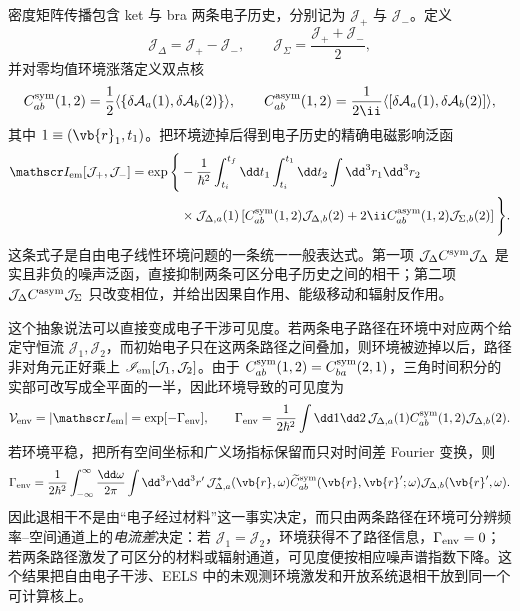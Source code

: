 密度矩阵传播包含 ket 与 bra 两条电子历史，分别记为
$\mathcal J_+$ 与 $\mathcal J_-$。定义
\[
\mathcal J_\Delta=\mathcal J_+-\mathcal J_-,
\qquad
\mathcal J_\Sigma=\frac{\mathcal J_++\mathcal J_-}{2},
\]
并对零均值环境涨落定义双点核
\[
C_{ab}^{\rm sym}(1,2)
=\frac12\langle\{\delta\mathcal A_a(1),\delta\mathcal A_b(2)\}\rangle,
\qquad
C_{ab}^{\rm asym}(1,2)
=\frac1{2\ii}\langle[\delta\mathcal A_a(1),\delta\mathcal A_b(2)]\rangle,
\]
其中 $1\equiv(\vb{r}_1,t_1)$。把环境迹掉后得到电子历史的精确电磁影响泛函
\begin{equation}
{
\begin{aligned}
\mathscr I_{\rm em}[\mathcal J_+,\mathcal J_-]
=\exp\Bigg\{&-\frac1{\hbar^2}
\int_{t_i}^{t_f}\dd t_1
\int_{t_i}^{t_1}\dd t_2
\int\dd^3r_1\dd^3r_2\\
&\times\mathcal J_{\Delta,a}(1)
\left[
C_{ab}^{\rm sym}(1,2)\mathcal J_{\Delta,b}(2)
+2\ii C_{ab}^{\rm asym}(1,2)\mathcal J_{\Sigma,b}(2)
\right]\Bigg\}.
\end{aligned}}
\label{eq:em_gaussian_influence_functional}
\end{equation}
这条式子是自由电子线性环境问题的一条统一一般表达式。第一项
$\mathcal J_\Delta C^{\rm sym}\mathcal J_\Delta$ 是实且非负的噪声泛函，直接抑制两条可区分电子历史之间的相干；第二项
$\mathcal J_\Delta C^{\rm asym}\mathcal J_\Sigma$ 只改变相位，并给出因果自作用、能级移动和辐射反作用。

这个抽象说法可以直接变成电子干涉可见度。若两条电子路径在环境中对应两个给定守恒流 $\mathcal J_1,\mathcal J_2$，而初始电子只在这两条路径之间叠加，则环境被迹掉以后，路径非对角元正好乘上 $\mathscr I_{\rm em}[\mathcal J_1,\mathcal J_2]$。由于 $C_{ab}^{\rm sym}(1,2)=C_{ba}^{\rm sym}(2,1)$，三角时间积分的实部可改写成全平面的一半，因此环境导致的可见度为
\begin{equation}
{
\mathcal V_{\rm env}
=|\mathscr I_{\rm em}|
=\exp[-\Gamma_{\rm env}],
\qquad
\Gamma_{\rm env}
=\frac1{2\hbar^2}
\int\dd1\dd2\,
\mathcal J_{\Delta,a}(1)
C_{ab}^{\rm sym}(1,2)
\mathcal J_{\Delta,b}(2).}
\label{eq:em_environment_visibility_functional}
\end{equation}
若环境平稳，把所有空间坐标和广义场指标保留而只对时间差 Fourier 变换，则
\[
\Gamma_{\rm env}
=\frac1{2\hbar^2}
\int_{-\infty}^{\infty}\frac{\dd\omega}{2\pi}
\int\dd^3r\dd^3r'\,
\mathcal J_{\Delta,a}^*(\vb{r},\omega)
\widetilde C_{ab}^{\rm sym}(\vb{r},\vb{r}';\omega)
\mathcal J_{\Delta,b}(\vb{r}',\omega).
\]
因此退相干不是由“电子经过材料”这一事实决定，而只由两条路径在环境可分辨频率--空间通道上的\emph{电流差}决定：若 $\mathcal J_1=\mathcal J_2$，环境获得不了路径信息，$\Gamma_{\rm env}=0$；若两条路径激发了可区分的材料或辐射通道，可见度便按相应噪声谱指数下降。这个结果把自由电子干涉、EELS 中的未观测环境激发和开放系统退相干放到同一个可计算核上。

